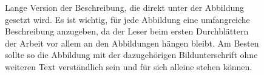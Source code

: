 
\begin{figure}
  \centering
  \caption[Kurzfassung der Beschreibung für das Abbildungsverzeichnis]{Lange Version der Beschreibung, die direkt unter der Abbildung gesetzt wird. Es ist wichtig, für jede Abbildung eine umfangreiche Beschreibung anzugeben, da der Leser beim ersten Durchblättern der Arbeit vor allem an den Abbildungen hängen bleibt. Am Besten sollte so die Abbildung mit der dazugehörigen Bildunterschrift ohne weiteren Text verständlich sein und für sich alleine stehen können.}
  \label{fig:flower}
\end{figure}

